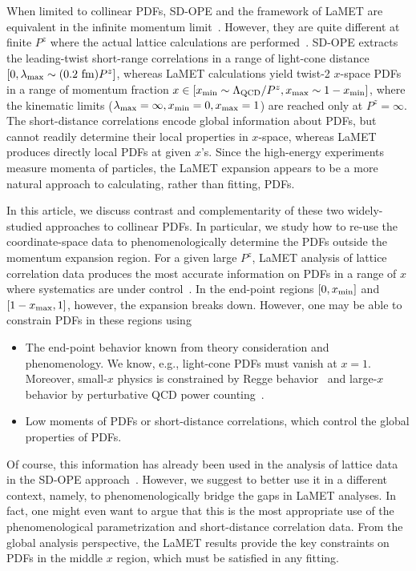 \documentclass[prd,aps,twocolumn,preprintnumbers,showpacs,nofootinbib,superscriptaddress,notitlepage]{revtex4-2}
\begin{document}
When limited to collinear PDFs, SD-OPE and the framework of LaMET are equivalent in the infinite momentum limit~\cite{Izubuchi:2018srq}. However, they are quite different at finite $P^z$ where the actual lattice calculations are performed~\cite{Ji:2020byp, Ji:2020brr}. SD-OPE extracts the leading-twist short-range correlations in a range of light-cone distance $[0,\lambda_{\rm max}\sim (0.2~{\rm fm})P^z ]$, whereas LaMET 
calculations yield twist-2 $x$-space PDFs in a range of momentum fraction $x \in [x_{\rm min}\sim \Lambda_{\rm QCD}/P^z, x_{\rm max}\sim 1-x_{\rm min}]$, where
the kinematic limits ($\lambda_{\rm max}=\infty, x_{\rm min}=0, x_{\rm max}=1$) are reached only at $P^z=\infty$. The short-distance correlations encode global information 
about PDFs, but cannot readily determine their local properties in $x$-space, whereas LaMET produces directly local PDFs at given $x$'s. Since the high-energy experiments measure momenta of particles, the LaMET expansion appears to be a more natural approach to calculating, rather than fitting, PDFs. 

In this article, we discuss contrast and complementarity of these two widely-studied approaches to collinear PDFs. In particular, we study how to re-use the coordinate-space data to phenomenologically determine the PDFs outside the momentum expansion region. For a given large $P^z$, LaMET analysis of lattice correlation data produces the most accurate information on PDFs in a range of $x$ where systematics are under control~\cite{Ji:2020byp,Gao:2021dbh}. In the end-point regions $[0,x_{\rm min}]$ and $[1-x_{\rm max},1]$, however, the expansion breaks down. However, one may be able to constrain PDFs in these regions using  
\begin{itemize}
    \item The end-point behavior known from theory consideration and phenomenology. We know, e.g.,  light-cone 
    PDFs must vanish at $x=1$. Moreover, small-$x$ physics is constrained by Regge behavior~\cite{Ioffe:1985ep} and large-$x$ behavior by perturbative QCD power counting~\cite{Brodsky:1973kr}. 
    \item Low moments of PDFs or short-distance correlations, which control the global properties of PDFs. 
\end{itemize}
Of course, this information has already been used in the analysis of lattice data in the SD-OPE approach~\cite{Karpie:2019eiq,Sufian:2019bol,Joo:2019jct,Joo:2019bzr,Sufian:2020vzb,Bhat:2020ktg,Gao:2020ito,DelDebbio:2020rgv,Joo:2020spy,Karpie:2021pap}. However, we suggest to better use it in a different context, namely, to phenomenologically bridge the gaps in LaMET analyses. In fact, one might even want to argue that this is the most appropriate use of the 
phenomenological parametrization and short-distance correlation data. From the global analysis perspective, the LaMET results provide the key constraints on PDFs in the middle $x$ region, which must be satisfied in any fitting.
\end{document}

